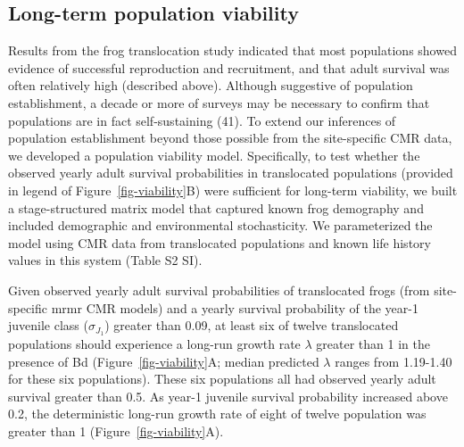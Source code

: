 \documentclass[9pt,twocolumn,twoside,lineno]{pnas-new}
\begin{document}
\subsection*{Long-term population viability}

Results from the frog translocation study indicated that most
populations showed evidence of successful reproduction and recruitment,
and that adult survival was often relatively high (described above).
Although suggestive of population establishment, a decade or more of
surveys may be necessary to confirm that populations are in fact
self-sustaining (41). To extend our inferences of population
establishment beyond those possible from the site-specific CMR data, we
developed a population viability model. Specifically, to test whether
the observed yearly adult survival probabilities in translocated
populations (provided in legend of Figure~\ref{fig-viability}B) were
sufficient for long-term viability, we built a stage-structured matrix
model that captured known frog demography and included demographic and
environmental stochasticity. We parameterized the model using CMR data
from translocated populations and known life history values in this
system (Table S2 SI).

Given observed yearly adult survival probabilities of translocated frogs
(from site-specific mrmr CMR models) and a yearly survival probability
of the year-1 juvenile class (\(\sigma_{J_1}\)) greater than 0.09, at
least six of twelve translocated populations should experience a
long-run growth rate \(\lambda\) greater than 1 in the presence of Bd
(Figure~\ref{fig-viability}A; median predicted \(\lambda\) ranges from
1.19-1.40 for these six populations). These six populations all had
observed yearly adult survival greater than 0.5. As year-1 juvenile
survival probability increased above 0.2, the deterministic long-run
growth rate of eight of twelve population was greater than 1
(Figure~\ref{fig-viability}A).
\end{document}
